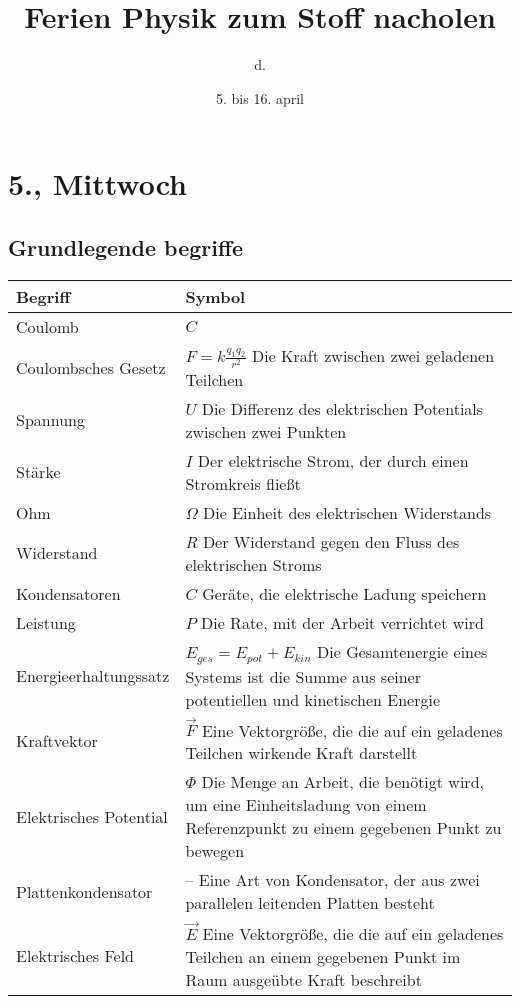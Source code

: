 \documentclass{article}
\title{Ferien Physik zum Stoff nacholen}
\author{d.}
\date{5. bis 16. april}
\begin{document}
\maketitle
\tableofcontents
\clearpage

\section{5., Mittwoch}
\subsection{Grundlegende begriffe}

\begin{center}
\vspace{-10pt}
\begin{table}[!htbp]
\centering
\begin{tabular}{|p{4cm}|p{10cm}|}
    \toprule
    \textbf{Begriff} & \textbf{Symbol} \\
    \midrule
        Coulomb & $C$ \\
        \rowcolor{lightgray}
        Coulombsches Gesetz & $F = k \frac{q_1q_2}{r^2}$ Die Kraft zwischen zwei geladenen Teilchen \\
        \rowcolor{white}
        Spannung & $U$ Die Differenz des elektrischen Potentials zwischen zwei Punkten \\
        \rowcolor{lightgray}
        Stärke & $I$ Der elektrische Strom, der durch einen Stromkreis fließt \\
        \rowcolor{white}
        Ohm & $\Omega$ Die Einheit des elektrischen Widerstands \\
        \rowcolor{lightgray}
        Widerstand & $R$ Der Widerstand gegen den Fluss des elektrischen Stroms \\
        \rowcolor{white}
        Kondensatoren & $C$ Geräte, die elektrische Ladung speichern \\
        \rowcolor{lightgray}
        Leistung & $P$ Die Rate, mit der Arbeit verrichtet wird \\
        \rowcolor{white}
        Energieerhaltungssatz & $E_{ges} = E_{pot} + E_{kin}$ Die Gesamtenergie eines Systems ist die Summe aus seiner potentiellen und kinetischen Energie \\
        \rowcolor{lightgray}
        Kraftvektor & $\vec{F}$ Eine Vektorgröße, die die auf ein geladenes Teilchen wirkende Kraft darstellt \\
        \rowcolor{white}
        Elektrisches Potential & $\Phi$ Die Menge an Arbeit, die benötigt wird, um eine Einheitsladung von einem Referenzpunkt zu einem gegebenen Punkt zu bewegen \\
        \rowcolor{lightgray}
        Plattenkondensator & -- Eine Art von Kondensator, der aus zwei parallelen leitenden Platten besteht \\
        \rowcolor{white}
        Elektrisches Feld & $\vec{E}$ Eine Vektorgröße, die die auf ein geladenes Teilchen an einem gegebenen Punkt im Raum ausgeübte Kraft beschreibt \\
    \bottomrule
\end{tabular}%
\end{table}%
\end{center}
\end{document}
